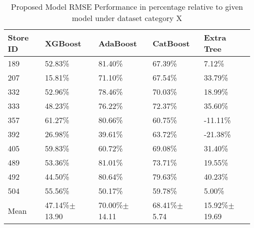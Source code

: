 \begin{table*}[]
\centering
\caption{Proposed Model RMSE Performance in percentage relative to given model under dataset category X}
\setlength{\tabcolsep}{3pt}
 {\renewcommand{\arraystretch}{1}%
\label{tab:my-table}
\begin{tabular}{p{}p{}p{}p{}p{}}
\hline
\textbf{Store ID} & \textbf{XGBoost}  & \textbf{AdaBoost}  & \textbf{CatBoost}  & \textbf{Extra Tree}  \\ \hline
189        & 52.83\%         & 81.40\%          & 67.39\%          & 7.12\%             \\
207        & 15.81\%         & 71.10\%          & 67.54\%          & 33.79\%             \\
332        & 52.96\%         & 78.46\%          & 70.03\%           & 18.99\%            \\
333        & 48.23\%         & 76.22\%          & 72.37\%          & 35.60\%            \\
357        & 61.27\%         & 80.66\%          & 60.75\%          & -11.11\%           \\
392        & 26.98\%         & 39.61\%          & 63.72\%          & -21.38\%           \\
405        & 59.83\%         & 60.72\%          & 69.08\%          & 31.40\%            \\
489        & 53.36\%         & 81.01\%            & 73.71\%          & 19.55\%            \\
492        & 44.50\%         & 80.64\%          & 79.63\%          & 40.23\%            \\
504        & 55.56\%         & 50.17\%          & 59.78\%          & 5.00\%             \\ \hline 
Mean     & 47.14\%$\pm$ 13.90  & 70.00\%$\pm$ 14.11   &68.41\%$\pm$ 5.74   & 15.92\%$\pm$ 19.69    \\ \hline
\end{tabular}%
}
\end{table*}

